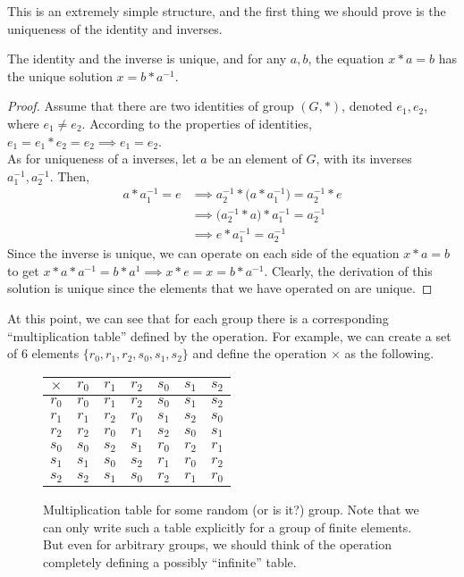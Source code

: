   This is an extremely simple structure, and the first thing we should prove is the uniqueness of the identity and inverses. 

  \begin{lemma}
    The identity and the inverse is unique, and for any $a, b$, the equation $x*a = b$ has the unique solution $x = b* a^{-1}$.
  \end{lemma}
  \begin{proof}
     Assume that there are two identities of group $(G,*)$, denoted $e_{1}, e_{2}$, where $e_{1} \neq e_{2}$. According to the properties of identities, $e_{1} = e_{1} * e_{2} = e_{2} \implies e_{1} = e_{2}$. \\
    As for uniqueness of a inverses, let $a$ be an element of $G$, with its inverses $a_{1}^{-1}, a_{2}^{-1}$. Then, 
    \begin{align*}
      a * a_{1}^{-1} = e & \implies a_{2}^{-1} * \Big(a * a_{1}^{-1} \Big)= a_{2}^{-1} * e \\
       & \implies \Big(a_{2}^{-1} * a \Big) * a_{1}^{-1} = a_{2}^{-1} \\
       & \implies e * a_{1}^{-1} = a_{2}^{-1}
    \end{align*}
    Since the inverse is unique, we can operate on each side of the equation $x*a = b$ to get $x*a*a^{-1} = b*a^{1} \implies x * e = x = b*a^{-1}$. Clearly, the derivation of this solution is unique since the elements that we have operated on are unique.
  \end{proof} 
  
  At this point, we can see that for each group there is a corresponding ``multiplication table'' defined by the operation. For example, we can create a set of $6$ elements $\{r_0, r_1, r_2, s_0, s_1, s_2\}$ and define the operation $\times$ as the following. 

  \begin{figure}[H]
    \centering 
    \begin{tabular}{c|cccccc}
      $\times$ & $r_0$ & $r_1$ & $r_2$ & $s_0$ & $s_1$ & $s_2$ \\
      \hline
      $r_0$ & $r_0$ & $r_1$ & $r_2$ & $s_0$ & $s_1$ & $s_2$ \\
      $r_1$ & $r_1$ & $r_2$ & $r_0$ & $s_1$ & $s_2$ & $s_0$ \\
      $r_2$ & $r_2$ & $r_0$ & $r_1$ & $s_2$ & $s_0$ & $s_1$ \\
      $s_0$ & $s_0$ & $s_2$ & $s_1$ & $r_0$ & $r_2$ & $r_1$ \\
      $s_1$ & $s_1$ & $s_0$ & $s_2$ & $r_1$ & $r_0$ & $r_2$ \\
      $s_2$ & $s_2$ & $s_1$ & $s_0$ & $r_2$ & $r_1$ & $r_0$ \\
    \end{tabular}
    \caption{Multiplication table for some random (or is it?) group. Note that we can only write such a table explicitly for a group of finite elements. But even for arbitrary groups, we should think of the operation completely defining a possibly ``infinite'' table.} 
  \end{figure} 


